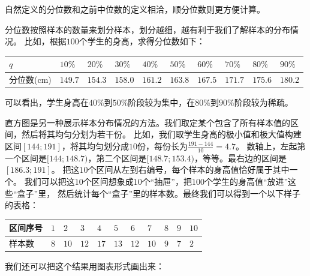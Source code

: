 \documentclass[12pt,UTF8,fontset=none]{ctexbook}
\begin{document}
自然定义的分位数和之前中位数的定义相洽，顺分位数则更方便计算。

分位数按照样本的数量来划分样本，划分越细，越有利于我们了解样本的分布情况。
比如，根据$100$个学生的身高，求得分位数如下：
\begin{center}
    \begin{tabular}{ | p{3.8em}<{\centering} | p{2em}<{\centering} | p{2em}<{\centering} | p{2em}<{\centering} | p{2em}<{\centering} | p{2em}<{\centering} | p{2em}<{\centering} | p{2em}<{\centering} | p{2em}<{\centering} | p{2em}<{\centering} | }
        \hline
            $q$   & $10\%$ & $20\%$ & $30\%$& $40\%$& $50\%$& $60\%$& $70\%$& $80\%$& $90\%$ \\ [0.5ex] 
        \hline
        {\scriptsize 分位数(cm)} & $149.7$ & $154.3$ & $158.0$ & $161.2$ & $163.8$ & $167.5$ & $171.7$ & $175.6$ & $180.2$ \\  
        \hline
    \end{tabular}
\end{center}

可以看出，学生身高在$40\%$到$50\%$阶段较为集中，在$80\%$到$90\%$阶段较为稀疏。


直方图是另一种展示样本分布情况的方法。我们取定某个包含了所有样本值的区间，然后将其均匀分划为若干份。
比如，我们取学生身高的极小值和极大值构建区间$[144;191]$，将其均匀划分成$10$份，每份长为$\frac{191-144}{10}=4.7$。
数轴上，左起第一个区间是$[144;148.7)$，第二个区间是$[148.7;153.4)$，等等。最右边的区间是$[186.3;191]$。
把这$10$个区间从左到右编号，每个样本的身高值恰好属于其中一个。
我们可以把这$10$个区间想象成$10$个“抽屉”，把$100$个学生的身高值“放进”这些“盒子”里，
然后统计每个“盒子”里的样本数。最终我们可以得到一个以下样子的表格：
\begin{center}
    \begin{tabular}{ | p{4em}<{\centering} | p{1.7em}<{\centering} | p{1.7em}<{\centering} | p{1.7em}<{\centering} | p{1.7em}<{\centering} | p{1.7em}<{\centering} | p{1.7em}<{\centering} | p{1.7em}<{\centering} | p{1.7em}<{\centering} | p{1.7em}<{\centering} | p{1.7em}<{\centering} | }
        \hline
        区间序号 & $1$ & $2$  & $3$  & $4$  & $5$  & $6$  & $7$  & $8$ & $9$ & $10$ \\ [0.5ex] 
        \hline
        样本数   & $8$ & $10$ & $12$ & $17$ & $13$ & $12$ & $10$ & $9$ & $7$ & $2$  \\  
        \hline
    \end{tabular}
\end{center}
我们还可以把这个结果用图表形式画出来：
\end{document}
